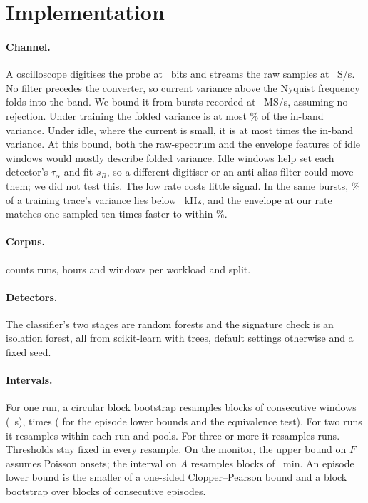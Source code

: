 \section{Implementation}\label{a:impl}

\paragraph{Channel.} A \Digitiser{} oscilloscope digitises the probe at \DigBits{}~bits
and streams the raw samples at \Fs{}~S/s. No filter precedes the converter, so current
variance above the Nyquist frequency folds into the band. We bound it from bursts
recorded at \BurstRate{}~MS/s, assuming no rejection. Under training the folded
variance is at most \AliasTrainPct\% of the in-band variance. Under idle, where the
current is small, it is at most \AliasIdleX{} times the in-band variance. At this bound,
both the raw-spectrum and the envelope features of idle windows would mostly describe
folded variance. Idle windows help set each detector's $\tau_\alpha$ and fit $s_R$, so a
different digitiser or an anti-alias filter could move them; we did not test this. The
low rate costs little signal. In the same bursts, \ChainBelowBand\% of a training trace's variance lies below
\ChainBandKhz{}~kHz, and the envelope at our rate matches one sampled ten times faster
to within \ChainEnvPct\%.

\paragraph{Corpus.}  counts runs, hours and windows per workload and
split.

\begin{table}[!htbp]
  \centering
  \small
  
  \caption{The corpus per workload and split: runs, scored hours and windows at the
    window-level hop. Time-sharing on the test day is the embedded episodes of
    \cref{s:works}.}
  \label{t:corpus}
\end{table}

\paragraph{Detectors.} The classifier's two stages are random forests and the
signature check is an isolation forest, all from scikit-learn with \ForestTrees{} trees,
default settings otherwise and a fixed seed.

\paragraph{Intervals.} For one run, a circular block bootstrap resamples blocks of
\BootBlock{} consecutive windows (\BootBlockS~s), \NBoot{} times
(\NBootBound{} for the episode lower bounds and the equivalence test). For two runs it
resamples within each run and pools. For three or more it resamples runs. Thresholds
stay fixed in every resample. On the monitor, the upper bound on $F$ assumes Poisson
onsets; the interval on $A$ resamples blocks of \OnsetBlockMin~min. An episode lower bound
is the smaller of a one-sided Clopper--Pearson bound and a block bootstrap over blocks
of \EpBlock{} consecutive episodes.

